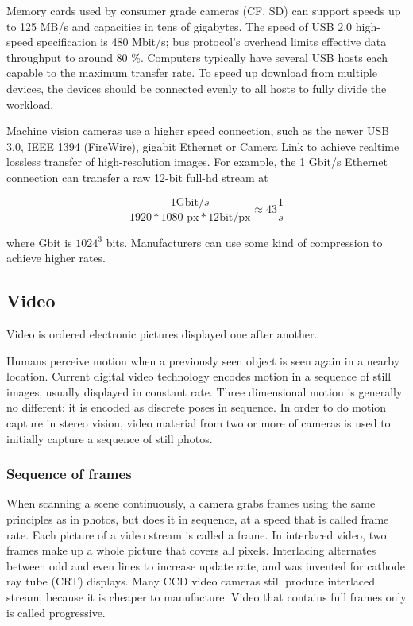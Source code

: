 Memory cards used by consumer grade cameras (CF, SD) can support speeds up to 125 MB/s and capacities in tens of gigabytes.
The speed of USB 2.0 high-speed specification is 480 Mbit/s; bus protocol's overhead limits effective data throughput to around 80 \%.
Computers typically have several USB hosts each capable to the maximum transfer rate.
To speed up download from multiple devices, the devices should be connected evenly to all hosts to fully divide the workload.

Machine vision cameras use a higher speed connection, such as the newer USB 3.0, IEEE 1394 (FireWire), gigabit Ethernet or Camera Link to achieve realtime lossless transfer of high-resolution images.
For example, the 1 Gbit/s Ethernet connection can transfer a raw 12-bit full-hd stream at

\[
	\frac{1 \text{Gbit}/s}{1920 * 1080 \text{ px} * 12 \text{bit}/\text{px}} \approx 43 \frac{1}{s}
\]

where Gbit is $1024^3$ bits.
Manufacturers can use some kind of compression to achieve higher rates.



\subsection{Video} \label{sec:video} %

Video is ordered electronic pictures displayed one after another.



Humans perceive motion when a previously seen object is seen again in a nearby location.
Current digital video technology encodes motion in a sequence of still images, usually displayed in constant rate.
Three dimensional motion is generally no different: it is encoded as discrete poses in sequence.
In order to do motion capture in stereo vision, video material from two or more of cameras is used to initially capture a sequence of still photos.


\subsubsection{Sequence of frames} %

When scanning a scene continuously, a camera grabs frames using the same principles as in photos, but does it in sequence, at a speed that is called frame rate.
Each picture of a video stream is called a frame.
In interlaced video, two frames make up a whole picture that covers all pixels.
Interlacing alternates between odd and even lines to increase update rate, and was invented for cathode ray tube (CRT) displays.
Many CCD video cameras still produce interlaced stream, because it is cheaper to manufacture.
Video that contains full frames only is called progressive.

